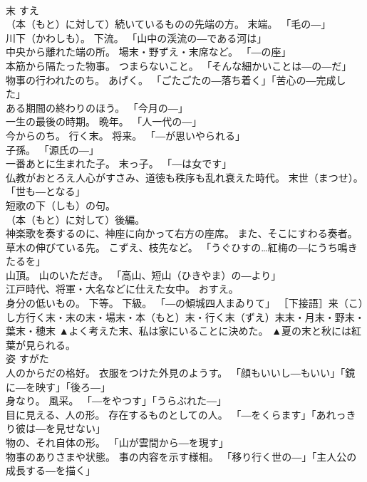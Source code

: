 \documentclass[8pt]{extreport}
\begin{document}
\begin{CJK}{UTF8}{min}
\\	末	すえ	
\\	（本（もと）に対して）続いているものの先端の方。 末端。 「毛の―」 
\\	川下（かわしも）。 下流。 「山中の渓流の―である河は」 
\\	中央から離れた端の所。 場末・野ずえ・末席など。 「―の座」 
\\	本筋から隔たった物事。 つまらないこと。 「そんな細かいことは―の―だ」 
\\	物事の行われたのち。 あげく。 「ごたごたの―落ち着く」「苦心の―完成した」 
\\	ある期間の終わりのほう。 「今月の―」 
\\	一生の最後の時期。 晩年。 「人一代の―」 
\\	今からのち。 行く末。 将来。 「―が思いやられる」 
\\	子孫。 「源氏の―」 
\\	一番あとに生まれた子。 末っ子。 「―は女です」 
\\	仏教がおとろえ人心がすさみ、道徳も秩序も乱れ衰えた時代。 末世（まつせ）。 「世も―となる」 
\\	短歌の下（しも）の句。 
\\	（本（もと）に対して）後編。 
\\	神楽歌を奏するのに、神座に向かって右方の座席。 また、そこにすわる奏者。 
\\	草木の伸びている先。 こずえ、枝先など。 「うぐひすの…紅梅の―にうち鳴きたるを」 
\\	山頂。 山のいただき。 「高山、短山（ひきやま）の―より」 
\\	江戸時代、将軍・大名などに仕えた女中。 おすえ。 
\\	身分の低いもの。 下等。 下級。 「―の傾城四人まゐりて」 ［下接語］来（こ）し方行く末・末の末・場末・本（もと）末・行く末（ずえ）末末・月末・野末・葉末・穂末	▲よく考えた末、私は家にいることに決めた。 ▲夏の末と秋には紅葉が見られる。
\\	姿	すがた	
\\	人のからだの格好。 衣服をつけた外見のようす。 「顔もいいし―もいい」「鏡に―を映す」「後ろ―」 
\\	身なり。 風采。 「―をやつす」「うらぶれた―」 
\\	目に見える、人の形。 存在するものとしての人。 「―をくらます」「あれっきり彼は―を見せない」 
\\	物の、それ自体の形。 「山が雲間から―を現す」 
\\	物事のありさまや状態。 事の内容を示す様相。 「移り行く世の―」「主人公の成長する―を描く」 

\end{CJK}
\end{document}
